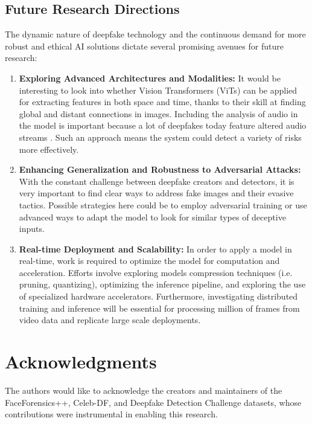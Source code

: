 \documentclass[conference]{IEEEtran}
\begin{document}
\subsection{Future Research Directions}
The dynamic nature of deepfake technology and the continuous demand for more robust and ethical AI solutions dictate several promising avenues for future research:
\begin{enumerate}
\item \textbf{Exploring Advanced Architectures and Modalities:}  It would be interesting to look into whether Vision Transformers (ViTs) can be applied for extracting features in both space and time, thanks to their skill at finding global and distant connections in images. Including the analysis of audio in the model is important because a lot of deepfakes today feature altered audio streams \cite{dissanayake2025review}. Such an approach means the system could detect a variety of risks more effectively.
\item \textbf{Enhancing Generalization and Robustness to Adversarial Attacks:} With the constant challenge between deepfake creators and detectors, it is very important to find clear ways to address fake images and their evasive tactics. Possible strategies here could be to employ adversarial training or use advanced ways to adapt the model to look for similar types of deceptive inputs.


\item \textbf{Real-time Deployment and Scalability:} In order to apply a model in real-time, work is required to optimize the model for computation and acceleration. Efforts involve exploring models compression techniques (i.e. pruning, quantizing), optimizing the inference pipeline, and exploring the use of specialized hardware accelerators. Furthermore, investigating distributed training and inference will be essential for processing million of frames from video data and replicate large scale deployments.


\end{enumerate}

\section*{Acknowledgments}
The authors would like to acknowledge the creators and maintainers of the FaceForensics++, Celeb-DF, and Deepfake Detection Challenge datasets, whose contributions were instrumental in enabling this research.
\end{document}
